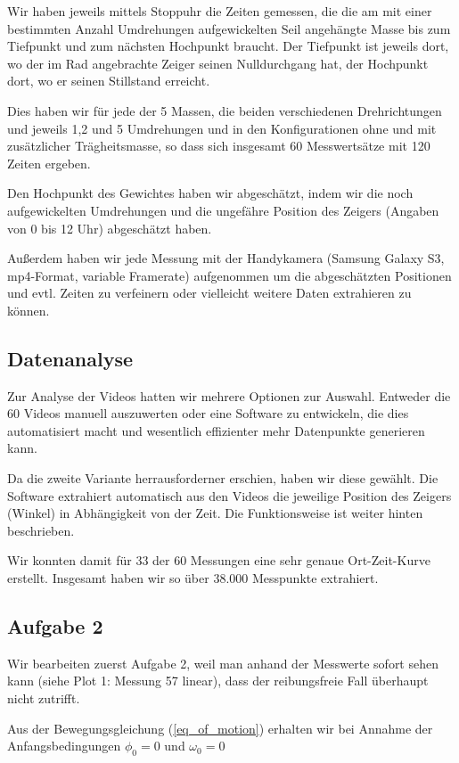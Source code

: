 \documentclass[a4paper,german,12pt,smallheadings]{scrartcl}
\begin{document}
Wir haben jeweils mittels Stoppuhr die Zeiten gemessen, die die am mit einer
bestimmten Anzahl Umdrehungen aufgewickelten Seil angehängte Masse bis zum
Tiefpunkt und zum nächsten Hochpunkt braucht. Der Tiefpunkt ist jeweils dort,
wo der im Rad angebrachte Zeiger seinen Nulldurchgang hat, der Hochpunkt dort,
wo er seinen Stillstand erreicht.

Dies haben wir für jede der 5 Massen, die beiden verschiedenen Drehrichtungen
und jeweils 1,2 und 5 Umdrehungen und in den Konfigurationen ohne und mit
zusätzlicher Trägheitsmasse, so dass sich insgesamt 60 Messwertsätze mit 120
Zeiten ergeben.

Den Hochpunkt des Gewichtes haben wir abgeschätzt, indem wir die noch
aufgewickelten Umdrehungen und die ungefähre Position des Zeigers (Angaben von
0 bis 12 Uhr) abgeschätzt haben.

Außerdem haben wir jede Messung mit der Handykamera (Samsung Galaxy S3,
mp4-Format, variable Framerate) aufgenommen um die abgeschätzten Positionen und
evtl. Zeiten zu verfeinern oder vielleicht weitere Daten extrahieren zu können.

\subsection{Datenanalyse}
Zur Analyse der Videos hatten wir mehrere Optionen zur Auswahl. Entweder die 60
Videos manuell auszuwerten oder eine Software zu entwickeln, die dies
automatisiert macht und wesentlich effizienter mehr Datenpunkte generieren kann.

Da die zweite Variante herrausforderner erschien, haben wir diese gewählt. Die
Software extrahiert automatisch aus den Videos die jeweilige Position des
Zeigers (Winkel) in Abhängigkeit von der Zeit. Die Funktionsweise ist weiter
hinten beschrieben.

Wir konnten damit für 33 der 60 Messungen eine sehr genaue Ort-Zeit-Kurve
erstellt. Insgesamt haben wir so über 38.000 Messpunkte extrahiert.

\subsection{Aufgabe 2}
Wir bearbeiten zuerst Aufgabe 2, weil man anhand der Messwerte sofort sehen
kann (siehe Plot 1: Messung 57 linear), dass der reibungsfreie Fall überhaupt
nicht zutrifft.

Aus der Bewegungsgleichung (\ref{eq_of_motion}) erhalten wir bei
Annahme der Anfangsbedingungen $\phi_0 = 0$ und $\omega_0 = 0$
\end{document}
